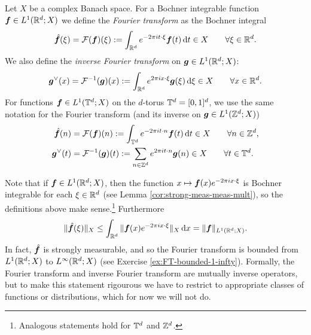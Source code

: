 \begin{defn}
  Let $X$ be a complex Banach space.
  For a Bochner integrable function $\bm{f} \in L^1(\mathbb{R}^d;X)$ we define the \emph{Fourier transform} as the Bochner integral
  \begin{equation*}
    \hat{\bm{f}}(\xi) = \mathcal{F}(\bm{f})(\xi) := \int_{\mathbb{R}^d} e^{-2\pi i t \cdot \xi} \bm{f}(t)  \, \mathrm{d} t \in X \qquad \forall \xi \in \mathbb{R}^d. 
  \end{equation*}
  We also define the \emph{inverse Fourier transform} on $\bm{g} \in L^1(\mathbb{R}^d;X)$:
  \begin{equation*}
    \bm{g}^{\vee}(x) = \mathcal{F}^{-1}(\bm{g})(x) := \int_{\mathbb{R}^d} e^{2\pi i x \cdot \xi} \bm{g}(\xi) \, \mathrm{d} \xi \in X \qquad \forall x \in \mathbb{R}^d.
  \end{equation*}
  For functions $\bm{f} \in L^1(\mathbb{T}^d ; X)$ on the $d$-torus $\mathbb{T}^d = [0,1]^d$, we use the same notation for the Fourier transform (and its inverse on $\bm{g} \in L^1(\mathbb{Z}^d; X)$)
  \begin{equation*}
    \begin{aligned}
      \hat{\bm{f}}(n) &= \mathcal{F}(\bm{f})(n) := \int_{\mathbb{T}^d} e^{-2\pi i t \cdot n} \bm{f}(t)  \, \mathrm{d} t \in X \qquad \forall n \in \mathbb{Z}^d, \\
      \bm{g}^{\vee}(t) &= \mathcal{F}^{-1}(\bm{g})(t) := \sum_{n \in \mathbb{Z}^d} e^{2\pi i t \cdot n}  \bm{g}(n) \in X \qquad \forall t \in \mathbb{T}^d.
    \end{aligned}
  \end{equation*}
\end{defn}

Note that if $\bm{f} \in L^1(\mathbb{R}^d;X)$, then the function $x \mapsto \bm{f}(x)e^{-2\pi i x \cdot \xi}$ is Bochner integrable for each $\xi \in \mathbb{R}^d$ (see Lemma \ref{cor:strong-meas-meas-mult}), so the definitions above make sense.\footnote{Analogous statements hold for $\mathbb{T}^d$ and $\mathbb{Z}^d$.}
Furthermore
\begin{equation*}
  \|\hat{\bm{f}}(\xi)\|_X \leq \int_{\mathbb{R}^d} \| \bm{f}(x) e^{-2\pi i x \cdot \xi} \|_X \, \mathrm{d} x = \|\bm{f}\|_{L^1(\mathbb{R}^d;X)}.
\end{equation*}
In fact, $\hat{\bm{f}}$ is strongly measurable, and so the Fourier transform is bounded from $L^1(\mathbb{R}^d;X)$ to $L^\infty(\mathbb{R}^d;X)$ (see Exercise \ref{ex:FT-bounded-1-infty}).
Formally, the Fourier transform and inverse Fourier transform are mutually inverse operators, but to make this statement rigourous we have to restrict to appropriate classes of functions or distributions, which for now we will not do.

